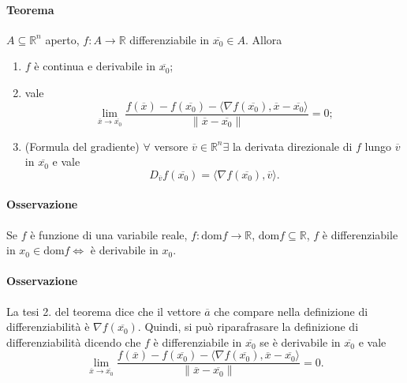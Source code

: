 \documentclass{article}
\newcommand{\R}{\mathbb{R}}
\newcommand{\dom}{\text{dom}}
\begin{document}
\paragraph{{Teorema}}
$A\subseteq\R^n$ aperto, $f:A\rightarrow\R$ differenziabile in $\overline{x_0}\in A$. Allora 
\begin{enumerate}
    \item $f$ è continua e derivabile in $\overline{x_0}$;
    \item vale 
    \begin{equation*}
         \lim_{\overline{x}\rightarrow\overline{x_0}}\frac{f(\overline{x})-f(\overline{x_0})-\langle \nabla f(\overline{x_0}),\overline{x}-\overline{x_0}\rangle}{\|\overline{x}-\overline{x_0}\|}=0;
    \end{equation*}
    \item (Formula del gradiente) $\forall$ versore $\overline{v}\in\R^n\exists$ la derivata direzionale di $f$ lungo $\overline{v}$ in $\overline{x_0}$ e vale
    \begin{equation*}
        D_{\overline{v}}f(\overline{x_0})=\langle \nabla f(\overline{x_0}), \overline{v} \rangle.
    \end{equation*}
\end{enumerate}

\paragraph{{Osservazione}}
Se $f$ è funzione di una variabile reale, $f: \dom f\rightarrow\R$, $\dom f \subseteq\R$, $f$ è differenziabile in $x_0\in \dom f \Leftrightarrow$ è derivabile in $x_0$.

\paragraph{{Osservazione}}
La tesi 2. del teorema dice che il vettore $\overline{a}$ che compare nella definizione di differenziabilità è $\nabla f(\overline{x_0})$. Quindi, si può riparafrasare la definizione di differenziabilità dicendo che $f$ è differenziabile in $\overline{x_0}$ se è derivabile in $\overline{x_0}$ e vale 
\begin{equation*}
         \lim_{\overline{x}\rightarrow\overline{x_0}}\frac{f(\overline{x})-f(\overline{x_0})-\langle \nabla f(\overline{x_0}),\overline{x}-\overline{x_0}\rangle}{\|\overline{x}-\overline{x_0}\|}=0.
\end{equation*}
\end{document}
